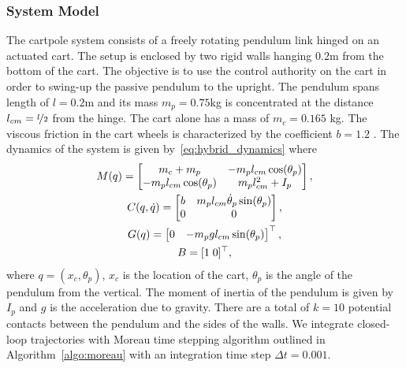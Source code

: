 \subsubsection{System Model}
\label{sssec:cartpole_model}

The cartpole system consists of a freely rotating pendulum link hinged on an
actuated cart.
%
The setup is enclosed by two rigid walls hanging $0.2$m from the bottom of the
cart.
%
The objective is to use the control authority on the cart in order to swing-up
the passive pendulum to the upright.
%
The pendulum spans length of $l=0.2$m and its mass $m_p = 0.75$kg is
concentrated at the distance $l_{cm}=\nicefrac{l}{2}$ from the hinge.
%
The cart alone has a mass of $m_c=0.165$ kg. The viscous friction in the cart
wheels is characterized by the coefficient $b=1.2$ .
%
The dynamics of the system is given by~\eqref{eq:hybrid_dynamics} where 
%
\begin{equation}
    \begin{gathered}
    M(q) = \begin{bmatrix}m_c + m_p & -m_p l_{cm} \cos(\theta_p) \\
        -m_pl_{cm}\cos(\theta_p) & m_p l_{cm}^2+I_p\end{bmatrix}, \\
    C(q, \dot{q}) = \begin{bmatrix}b  & m_pl_{cm}\dot{\theta}_p\sin(\theta_p) \\
        0 & 0\end{bmatrix}, \\
    G(q) = \begin{bmatrix}0 & -m_pg l_{cm} \sin(\theta_p)\end{bmatrix}^\top, \\
        B = [1 \; 0]^\top,
    \end{gathered}
\end{equation}
\noindent where $q = (x_c, \theta_p)$, $x_c$ is the location of the cart,
$\theta_p$ is the angle of the pendulum from the vertical. The moment of inertia
of the pendulum is given by $I_p$ and $g$ is the acceleration due to gravity. 
%
There are a total of $k=10$ potential contacts between the pendulum and the sides of
the walls.
%
We integrate closed-loop trajectories with Moreau time stepping algorithm
outlined in Algorithm~\eqref{algo:moreau} with an integration time step $\Delta
t=0.001$.
%
